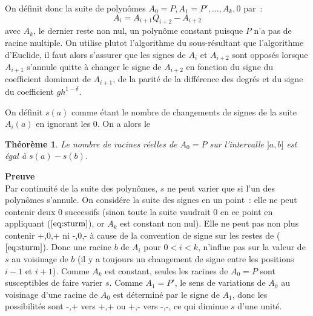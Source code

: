 \documentclass[a4paper,11pt]{book}
\newtheorem{thm}{Théorème}
\begin{document}
\begin{giacjshere}
On d\'efinit donc la suite de polyn\^omes $A_0=P, A_1=P', ..., A_k,0$
par~:
\begin{equation} \label{eq:sturm}
 A_{i} = A_{i+1} Q_{i+2} - A_{i+2} 
\end{equation}
avec $A_k$, le dernier reste non nul, un polyn\^ome constant puisque
$P$ n'a pas de racine multiple. On utilise plutot l'algorithme du 
sous-r\'esultant que l'algorithme d'Euclide, il faut alors
s'assurer que les signes de $A_i$ et $A_{i+2}$ sont oppos\'es lorsque
$A_{i+1} $ s'annule quitte \`a changer le signe de $A_{i+2}$ en fonction
du signe du coefficient dominant de $A_{i+1}$, de la parit\'e de
la diff\'erence des degr\'es et du signe du coefficient $gh^{1-\delta}$.

On d\'efinit $s(a)$ comme \'etant le nombre de changements de signes
de la suite $A_i(a)$ en ignorant les 0.
On a alors le 
\begin{thm}
Le nombre de racines r\'eelles de $A_0=P$ sur l'intervalle
$]a,b]$ est \'egal \`a $s(a)-s(b)$.
\end{thm}

{\bf Preuve}\\
Par continuit\'e de la suite des polyn\^omes, $s$ ne peut varier que
si l'un des polyn\^omes s'annule.
On consid\'ere la suite des signes en un point~: elle ne peut contenir
deux 0 successifs (sinon toute la suite vaudrait 0 en ce point en appliquant
(\(\ref{eq:sturm}\)), or $A_k$ est constant non nul). Elle ne peut pas
non plus contenir +,0,+ ni -,0,- \`a cause de la convention de signe
sur les restes de (\(\ref{eq:sturm}\)). Donc une racine $b$
de $A_i$ pour $ 0 < i < k $, n'influe pas sur la valeur de $s$ au voisinage
de $b$ (il y a toujours un changement de signe entre les positions
$i-1$ et $i+1$). Comme $A_k$ est constant, seules les racines de $A_0=P$
sont susceptibles de faire varier $s$. Comme $A_1=P'$, le sens de
variations de $A_0$ au voisinage d'une racine de $A_0$ est d\'etermin\'e
par le signe de $A_1$, donc les possibilit\'es sont -,+ vers +,+
ou +,- vers -,-, ce qui diminue $s$ d'une unit\'e.



\end{giacjshere}
\end{document}
